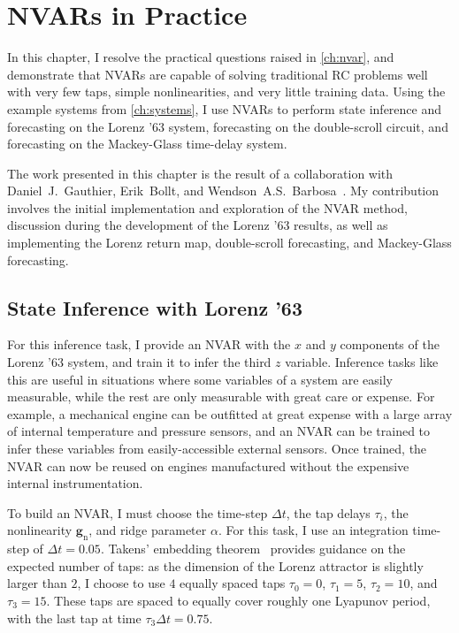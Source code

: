 \chapter{NVARs in Practice}\label{ch:nvar-application}

In this chapter, I resolve the practical questions raised in
\cref{ch:nvar}, and demonstrate that NVARs are capable of solving
traditional RC problems well with very few taps, simple
nonlinearities, and very little training data. Using the example
systems from \cref{ch:systems}, I use NVARs to perform state
inference and forecasting on the Lorenz '63 system, forecasting on the
double-scroll circuit, and forecasting on the Mackey-Glass time-delay
system.

The work presented in this chapter is the result of a
collaboration with Daniel~J.~Gauthier, Erik~Bollt, and Wendson~A.S.~Barbosa~\cite{gauthier2021}. My contribution involves the initial
implementation and exploration of the NVAR method, discussion during
the development of the Lorenz '63 results, as well as
implementing the Lorenz return map, double-scroll forecasting,
and Mackey-Glass forecasting.

\section{State Inference with Lorenz '63}

For this inference task, I provide an NVAR with the $x$ and $y$
components of the Lorenz '63 system, and train it to infer the third
$z$ variable. Inference tasks like this are useful in situations where
some variables of a system are easily measurable, while the rest are
only measurable with great care or expense. For example, a mechanical
engine can be outfitted at great expense with a large array of
internal temperature and pressure sensors, and an NVAR can be trained
to infer these variables from easily-accessible external sensors. Once
trained, the NVAR can now be reused on engines manufactured without
the expensive internal instrumentation.

To build an NVAR, I must choose the time-step $\Delta t$, the tap
delays $\tau_i$, the nonlinearity $\bm{g}_\text{n}$, and ridge
parameter $\alpha$. For this task, I use an integration time-step of
$\Delta t = 0.05$. Takens' embedding theorem~\cite{takens1981}
provides guidance on the expected number of taps: as the dimension of
the Lorenz attractor is slightly larger than $2$, I choose to use $4$
equally spaced taps $\tau_0 = 0$, $\tau_1 = 5$, $\tau_2 = 10$, and
$\tau_3 = 15$. These taps are spaced to equally cover roughly one
Lyapunov period, with the last tap at time $\tau_3 \Delta t = 0.75$.

